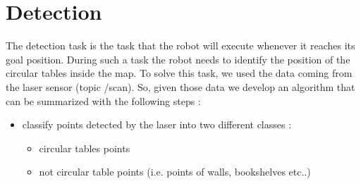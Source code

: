 \section{Detection}
The detection task is the task that the robot will execute whenever it reaches its goal position. During such a task the robot needs to identify the position of the circular tables inside the map. 
To solve this task, we used the data coming from the laser sensor (topic /scan). So, given those data we develop an algorithm that can be summarized with the following steps :
\begin{itemize}
    \item classify points detected by the laser into two different classes :
    \begin{itemize}
        \item circular tables points 
        \item not circular table points (i.e. points of walls, bookshelves etc..)
    \end{itemize}
\end{itemize}
